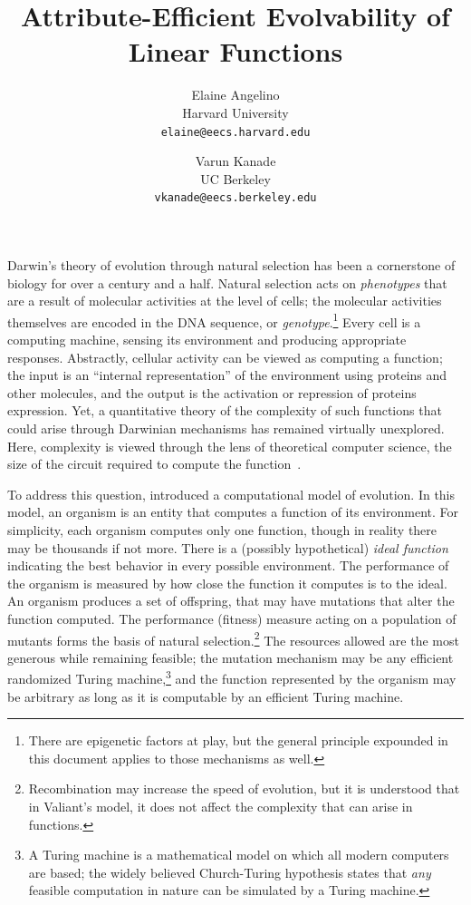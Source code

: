 \documentclass[11pt]{article}
\begin{document}
\title{Attribute-Efficient Evolvability of Linear Functions} 
\author{Elaine Angelino \\
Harvard University \\ \texttt{elaine@eecs.harvard.edu} \and Varun
Kanade \\ UC Berkeley \\ \texttt{vkanade@eecs.berkeley.edu}}

\maketitle

Darwin's theory of evolution through natural selection has been a cornerstone of
biology for over a century and a half.  Natural selection acts on
\emph{phenotypes} that are a result of molecular activities at the level of
cells; the molecular activities themselves are encoded in the DNA sequence, or
\emph{genotype}.\footnote{There are epigenetic factors at play, but the general
principle expounded in this document applies to those mechanisms as well.}
Every cell is a computing machine, sensing its environment and producing
appropriate responses.  Abstractly, cellular activity can be viewed as computing
a function; the input is an ``internal representation'' of the environment using
proteins and other molecules, and the output is the activation or repression
of proteins expression. Yet, a quantitative theory of the complexity of such
functions that could arise through Darwinian mechanisms has remained virtually
unexplored. Here, complexity is viewed through the lens of theoretical
computer science, \eg the size of the circuit required to compute the
function~\citep{Arora-Barak:textbook, Papadimitriou:textbook}.

To address this question, \citet{Valiant:2009-evolvability} introduced a
computational model of evolution.  In this model, an organism is an entity that
computes a function of its environment. For simplicity, each organism computes
only one function, though in reality there may be
thousands if not more. There is a (possibly hypothetical)
\emph{ideal function} indicating the best behavior in every possible
environment. The performance of the organism is measured by how close the
function it computes is to the ideal. An organism produces a set of offspring,
that may have mutations that  alter the function computed. The performance
(fitness) measure acting on a population of mutants forms the basis of natural
selection.\footnote{Recombination may increase the speed of evolution, but it is
understood that in Valiant's model, it does not affect the complexity that can
arise in functions.} The resources allowed are the most generous while remaining
feasible; the mutation mechanism may be any efficient randomized Turing
machine,\footnote{A Turing machine is a mathematical model on which all modern
computers are based; the widely believed Church-Turing hypothesis states that
\emph{any} feasible computation in nature can be simulated by a Turing
machine.} and the function represented by the organism may be arbitrary as long
as it is computable by an efficient Turing machine.
\end{document}
